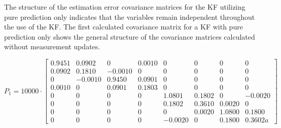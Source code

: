 \documentclass[]{article}
\begin{document}
\noindent The structure of the estimation error covariance matrices for the KF utilizing pure prediction only indicates that the variables remain independent throughout the use of the KF. The first calculated covariance matrix for a KF with pure prediction only shows the general structure of the covariance matrices calculated without measurement updates.

$$
P_1=10000\cdot\left[
\begin{array}{cccccccc}
0.9451  &  0.0902  &  0  &  0.0010   & 0 &  0 &  0  &  0\\
0.0902  &  0.1810  & -0.0010 &   0   & 0 &  0 &  0  &  0\\
0 & -0.0010  &  0.9450  &  0.0901    & 0 &  0 &  0  &  0\\
0.0010  &  0  &  0.0901  &  0.1803   & 0 &  0 &  0  &  0\\
0 & 0 & 0 & 0 & 1.0801 & 0.1802 & 0 & -0.0020\\
0 & 0 & 0 & 0 & 0.1802 & 0.3610 &  0.0020  &  0\\
0 & 0 & 0 & 0 &  0  &  0.0020  &  1.0800 &   0.1800\\
0 & 0 & 0 & 0 & -0.0020 &  0  &  0.1800  &  0.3602
a\end{array}
\right]
$$\\
\end{document}

